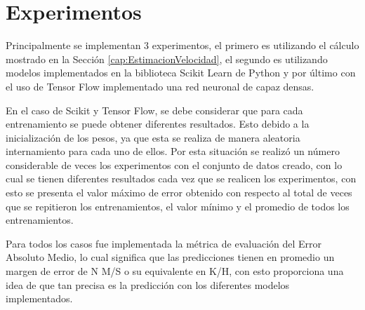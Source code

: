 \section{Experimentos}

Principalmente se implementan 3 experimentos, el primero es utilizando el cálculo mostrado en la Sección \ref{cap:EstimacionVelocidad}, el segundo es utilizando modelos implementados en la biblioteca Scikit Learn de Python y por último con el uso de Tensor Flow implementado una red neuronal de capaz densas.

En el caso de Scikit y Tensor Flow, se debe considerar que para cada entrenamiento se puede obtener diferentes resultados. Esto debido a la inicialización de los pesos, ya que esta se realiza de manera aleatoria internamiento para cada uno de ellos. Por esta situación se realizó un número considerable de veces los experimentos con el conjunto de datos creado, con lo cual se tienen diferentes resultados cada vez que se realicen los experimentos, con esto se presenta el valor máximo de error obtenido con respecto al total de veces que se repitieron los entrenamientos, el valor mínimo y el promedio de todos los entrenamientos.

Para todos los casos fue implementada la métrica de evaluación del Error Absoluto Medio, lo cual significa que las predicciones tienen en promedio un margen de error de N M/S o su equivalente en K/H, con esto proporciona una idea de que tan precisa es la predicción con los diferentes modelos implementados.

